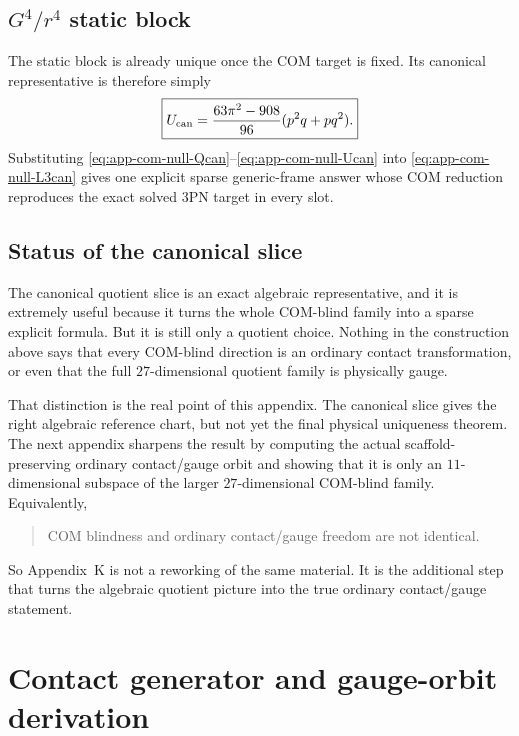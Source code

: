 \documentclass[11pt]{article}
\begin{document}
\subsection{\texorpdfstring{$G^4/r^4$}{G to the 4/r to the 4} static block}
\label{app:com-null-slice-g4}

The static block is already unique once the COM target is fixed.  Its canonical
representative is therefore simply
\begin{equation}
\boxed{
U_{\rm can}=\frac{63\pi^2-908}{96}(p^2q+pq^2).}
\label{eq:app-com-null-Ucan}
\end{equation}
Substituting
\eqref{eq:app-com-null-Qcan}--\eqref{eq:app-com-null-Ucan} into
\eqref{eq:app-com-null-L3can} gives one explicit sparse generic-frame answer
whose COM reduction reproduces the exact solved $3$PN target in every slot.

\subsection{Status of the canonical slice}
\label{app:com-null-status}

The canonical quotient slice is an exact algebraic representative, and it is
extremely useful because it turns the whole COM-blind family into a sparse
explicit formula.  But it is still only a quotient choice.  Nothing in the
construction above says that every COM-blind direction is an ordinary contact
transformation, or even that the full $27$-dimensional quotient family is
physically gauge.

That distinction is the real point of this appendix.  The canonical slice gives
the right algebraic reference chart, but not yet the final physical uniqueness
theorem.  The next appendix sharpens the result by computing the actual
scaffold-preserving ordinary contact/gauge orbit and showing that it is only an
$11$-dimensional subspace of the larger $27$-dimensional COM-blind family.
Equivalently,
\begin{quote}
COM blindness and ordinary contact/gauge freedom are not identical.
\end{quote}
So Appendix~K is not a reworking of the same material.  It is the additional
step that turns the algebraic quotient picture into the true ordinary
contact/gauge statement.


\section{Contact generator and gauge-orbit derivation}
\label{app:gauge-orbit}
\end{document}
